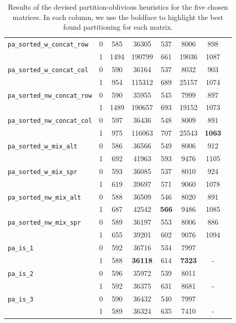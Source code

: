 \begin{table}[h]
\begin{tabular}{|l|c||c|c|c|c|c||c|}
		\verb|pa_sorted_w_concat_row| & 0 & 585 & 36305 & 537 & 8006 & 898 \\ %
		& 1 &  1494 & 190799 & 661 & 19036 & 1087 \\ \hline
		\verb|pa_sorted_w_concat_col| & 0 & 590 & 36164 & 537 & 8032 & 903 \\ %
		& 1 &  954 & 115312 & 689 & 25157 & 1074 \\ \hline
		\verb|pa_sorted_nw_concat_row| & 0 & 590 & 35955 & 545 & 7999 & 897 \\ %
		& 1 & 1489 & 190657 & 693 & 19152 & 1073 \\ \hline
		\verb|pa_sorted_nw_concat_col| & 0  & 597 & 36436 & 548 & 8009 & 891 \\ %
		& 1 & 975 & 116063 & 707 & 25543  & \textbf{1063} \\ \hline
		\verb|pa_sorted_w_mix_alt| & 0 &  586 & 36566 & 549 & 8006  & 912 \\ %
		& 1 & 692 & 41963 & 593 & 9476 & 1105 \\ \hline
		\verb|pa_sorted_w_mix_spr| & 0 &  593 & 36085 &  537 & 8010 & 924 \\ %
		& 1 & 619 & 39697 & 571 &  9060 & 1078 \\ \hline
		\verb|pa_sorted_nw_mix_alt| & 0 & 588 & 36509 & 546 & 8020 & 891 \\ %
		& 1 &  687 & 42542 & \textbf{566} & 9486 & 1085 \\ \hline
		\verb|pa_sorted_nw_mix_spr| & 0 & 589 & 36197 & 553 &8006  & 886 \\ %
		& 1 &  655 & 39201 & 602 & 9076 & 1094 \\ \hline
		\verb|pa_is_1| & 0 & 592 & 36716 & 534 & 7997 & \\ 
		& 1 & 588 & \textbf{36118} & 614 & \textbf{7323} & - \\ \hline
		\verb|pa_is_2| & 0 & 596 & 35972 &  539 & 8011 &  \\ 
		& 1 & 592 & 36375 &  631 & 8681 & - \\ \hline
		\verb|pa_is_3| & 0 & 590 & 36432 & 540 & 7997 &\\ 
		& 1 & 589 & 36324 & 635 & 7410 & -\\ \hline

	\end{tabular}
	\caption{Results of the devised partition-oblivious heuristics for the five chosen matrices. In each column, we use the boldface to highlight the best found partitioning for each matrix. } \label{tab:preliminary_pa}
\end{table}

